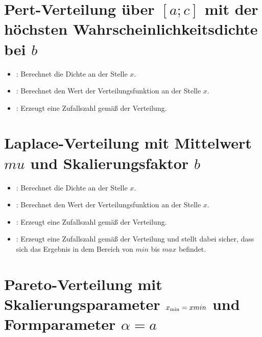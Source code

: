 \section{Pert-Verteilung über \texorpdfstring{$[a;c]$}{[a;c]} mit der höchsten Wahrscheinlichkeitsdichte bei \texorpdfstring{$b$}{b}}

\begin{itemize}

\item
{}:
Berechnet die Dichte an der Stelle $x$.

\item
{}:
Berechnet den Wert der Verteilungsfunktion an der Stelle $x$.

\item
{}:
Erzeugt eine Zufallszahl gemäß der Verteilung.

\end{itemize}



\section{Laplace-Verteilung mit Mittelwert \texorpdfstring{$mu$}{mu} und Skalierungsfaktor \texorpdfstring{$b$}{b}}

\begin{itemize}

\item
{}:
Berechnet die Dichte an der Stelle $x$.

\item
{}:
Berechnet den Wert der Verteilungsfunktion an der Stelle $x$.

\item
{}:
Erzeugt eine Zufallszahl gemäß der Verteilung.

\item
{}:
Erzeugt eine Zufallszahl gemäß der Verteilung und stellt dabei sicher, dass sich das Ergebnis in dem Bereich von $min$ bis $max$ befindet.

\end{itemize}



\section{Pareto-Verteilung mit Skalierungsparameter \texorpdfstring{$x_{\rm min}=xmin$}{xmin} und Formparameter \texorpdfstring{$\alpha=a$}{a}}

